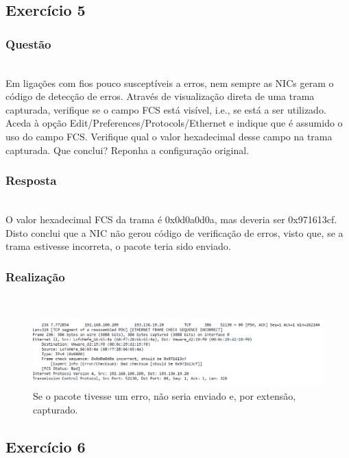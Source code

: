 \documentclass{llncs}
\begin{document}
\clearpage
\subsection{Exercício 5}
\subsubsection{Questão}\rule[-10pt]{0pt}{10pt}\\

Em ligações com fios pouco susceptíveis a erros, nem sempre as NICs geram o código de detecção de erros. Através de visualização direta de uma trama capturada, verifique se o campo FCS está visível, i.e., se está a ser utilizado. Aceda à opção Edit/Preferences/Protocols/Ethernet e indique que é assumido o uso do campo FCS. Verifique qual o valor hexadecimal desse campo na trama
capturada. Que conclui? Reponha a configuração original.

\subsubsection{Resposta}\rule[-10pt]{0pt}{10pt}\\

O valor hexadecimal FCS da trama é 0x0d0a0d0a, mas deveria ser 0x971613cf. Disto conclui que a NIC não gerou código de verificação de erros, visto que, se a trama estivesse incorreta, o pacote teria sido enviado.

\subsubsection{Realização}\rule[-10pt]{0pt}{10pt}\\

\begin{figure}
  \begin{center}
  \includegraphics[scale=0.35]{imagens/FCS.png} 
  \end{center}
  \caption{Se o pacote tivesse um erro, não seria enviado e, por extensão, capturado.}
  \label{fig:fcs_field}
\end{figure} 

\clearpage
\subsection{Exercício 6}
\end{document}
